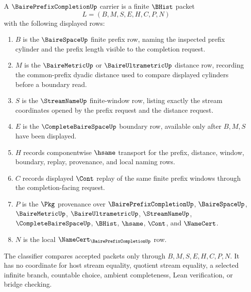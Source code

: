 \begin{definition}\label{def:baire-prefix-completion-carrier}
A $\BairePrefixCompletionUp$ carrier is a finite $\BHist$ packet
$$
L=(B,M,S,E,H,C,P,N)
$$
with the following displayed rows:
\begin{enumerate}
\item $B$ is the $\BaireSpaceUp$ finite prefix row, naming the inspected prefix cylinder and the prefix length visible to the completion request.
\item $M$ is the $\BaireMetricUp$ or $\BaireUltrametricUp$ distance row, recording the common-prefix dyadic distance used to compare displayed cylinders before a boundary read.
\item $S$ is the $\StreamNameUp$ finite-window row, listing exactly the stream coordinates opened by the prefix request and the distance request.
\item $E$ is the $\CompleteBaireSpaceUp$ boundary row, available only after $B,M,S$ have been displayed.
\item $H$ records componentwise $\hsame$ transport for the prefix, distance, window, boundary, replay, provenance, and local naming rows.
\item $C$ records displayed $\Cont$ replay of the same finite prefix windows through the completion-facing request.
\item $P$ is the $\Pkg$ provenance over $\BairePrefixCompletionUp$, $\BaireSpaceUp$, $\BaireMetricUp$, $\BaireUltrametricUp$, $\StreamNameUp$, $\CompleteBaireSpaceUp$, $\BHist$, $\hsame$, $\Cont$, and $\NameCert$.
\item $N$ is the local $\NameCert_{\BairePrefixCompletionUp}$ row.
\end{enumerate}
The classifier compares accepted packets only through $B,M,S,E,H,C,P,N$. It has no coordinate for host stream equality, quotient stream equality, a selected infinite branch, countable choice, ambient completeness, Lean verification, or bridge checking.
\end{definition}

